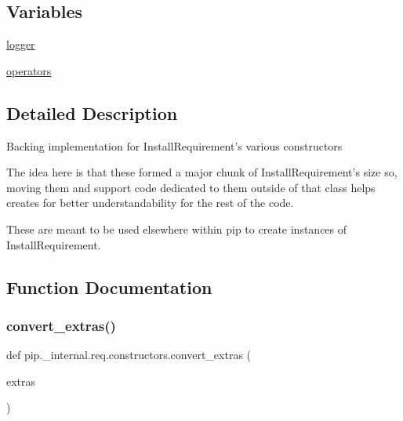 \subsection*{Variables}
\begin{DoxyCompactItemize}
\item 
\hyperlink{namespacepip_1_1__internal_1_1req_1_1constructors_a3fa73cdce7cd1839ac123a5fea17055d}{logger}
\item 
\hyperlink{namespacepip_1_1__internal_1_1req_1_1constructors_ae91c811dff5ff188e8d6847af9823118}{operators}
\end{DoxyCompactItemize}


\subsection{Detailed Description}
\begin{DoxyVerb}Backing implementation for InstallRequirement's various constructors

The idea here is that these formed a major chunk of InstallRequirement's size
so, moving them and support code dedicated to them outside of that class
helps creates for better understandability for the rest of the code.

These are meant to be used elsewhere within pip to create instances of
InstallRequirement.
\end{DoxyVerb}
 

\subsection{Function Documentation}
\mbox{\label{namespacepip_1_1__internal_1_1req_1_1constructors_a5108be7488d43adcb3f503889f4fb408}} 
\subsubsection{\texorpdfstring{convert\+\_\+extras()}{convert\_extras()}}
{\footnotesize\ttfamily def pip.\+\_\+internal.\+req.\+constructors.\+convert\+\_\+extras (\begin{DoxyParamCaption}\item[{}]{extras }\end{DoxyParamCaption})}

